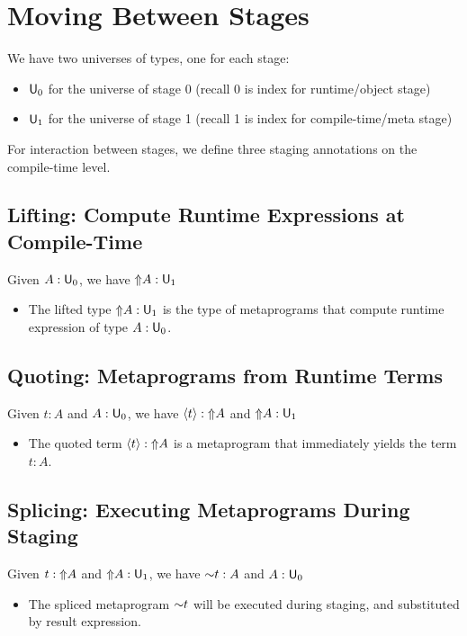 \documentclass[handout]{beamer}
\newenvironment{fr}[1][]
{\begin{frame}[fragile,environment=fr,#1]}
{\end{frame}}
\begin{document}


\section{Moving Between Stages}
\begin{fr}{\secname}
    We have two universes of types, one for each stage:
    \begin{itemize}
        \item $\mathsf{U}_0$ for the universe of stage 0 (recall 0 is index for runtime/object stage)
        \item $\mathsf{U}_1$ for the universe of stage 1 (recall 1 is index for compile-time/meta stage)
    \end{itemize}
    For interaction between stages, we define three staging annotations on the compile-time level.
\end{fr}

\subsection{Lifting: Compute Runtime Expressions at Compile-Time}

\begin{frame}{\subsecname}
    Given $A : \mathsf{U}_0$, we have ${\Uparrow} A : \mathsf{U}_1$
    \begin{itemize}
        \item The lifted type ${\Uparrow} A:\mathsf{U}_1$ is the type of metaprograms that compute runtime expression of type $A:\mathsf{U}_0$.
    \end{itemize}
\end{frame}

\subsection{Quoting: Metaprograms from Runtime Terms}
\begin{fr}{\subsecname}
Given $t:A$ and $A:\mathsf{U}_0$, we have $\langle t\rangle:{\Uparrow} A$ and ${\Uparrow} A: \mathsf{U}_1$
\begin{itemize}
    \item The quoted term $\langle t\rangle:{\Uparrow} A$ is a metaprogram that immediately yields the term $t:A$.
\end{itemize}
\end{fr}

\subsection{Splicing: Executing Metaprograms During Staging}
\begin{fr}{\subsecname}
Given $t:{\Uparrow} A$ and ${\Uparrow} A: \mathsf{U}_1$, we have ${\sim} t: A$ and $ A: \mathsf{U}_0$
\begin{itemize}
    \item The spliced metaprogram ${\sim} t$ will be executed during staging, and substituted by result expression.
\end{itemize}

\end{fr}
\end{document}
